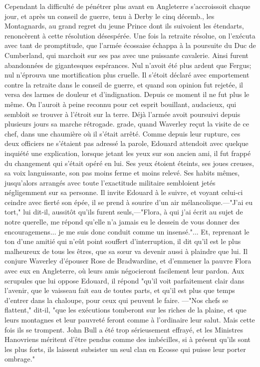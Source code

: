 {Cependant la difficulté de pénétrer plus avant en Angleterre s'accroissoit chaque jour, et après un conseil de guerre, tenu à Derby le cinq décemb., les Montagnards, au grand regret du jeune Prince dont ils suivoient les étendarts, renoncèrent à cette résolution désespérée. Une fois la retraite résolue, on l'exécuta avec tant de promptitude, que l'armée écossaise échappa à la poursuite du Duc de Cumberland, qui marchoit sur ses pas avec une puissante cavalerie.
Ainsi furent abandonnées de gigantesques espérances. Nul n'avoit été plus ardent que Fergus; nul n'éprouva une mortification plus cruelle. Il s'étoit déclaré avec emportement contre la retraite dans le conseil de guerre, et quand son opinion fut rejetée, il versa des larmes de douleur et d'indignation. Depuis ce moment il ne fut plus le même. On l'auroit à peine reconnu pour cet esprit bouillant, audacieux, qui sembloit se trouver à l'étroit sur la terre. Déjà l'armée avoit poursuivi depuis plusieurs jours sa marche rétrogade.\setcounter{page}{365} grade, quand Waverley reçut la visite de ce chef, dans une chaumière où il s’était arrêté.
Comme depuis leur rupture, ces deux officiers ne s’étaient pas adressé la parole, Edouard attendoit avec quelque inquiété une explication, lorsque jetant les yeux sur son ancien ami, il fut frappé du changement qui s’était opéré en lui. Ses yeux étoient éteints, ses joues creuses, sa voix languissante, son pas moins ferme et moins relevé. Ses habits mêmes, jusqu’alors arrangés avec toute l’exactitude militaire sembloient jetés négligemment sur sa personne. Il invite Edouard à le suivre, et voyant celui-ci ceindre avec fierté son épée, il se prend à sourire d’un air mélancolique.—"J’ai eu tort," lui dit-il, aussitôt qu’ils furent seuls,—"Flora, à qui j’ai écrit au sujet de notre querelle, me répond qu’elle n’a jamais eu le dessein de vous donner des encouragemens... je me suis donc conduit comme un insensé."... Et, reprenant le ton d’une amitié qui n’eût point souffert d’interruption, il dit qu’il est le plus malheureux de tous les êtres, que sa sœur va devenir aussi à plaindre que lui. Il conjure Waverley d’épouser Rose de Bradwardine, et d’emmener la pauvre Flora avec eux en Angleterre, où leurs amis négocieront facilement leur pardon. Aux scrupules que lui oppose Edouard, il répond\setcounter{page}{366} "qu'il voit parfaitement clair dans l'avenir, que le vaisseau fait eau de toutes parts, et qu'il est plus que temps d'entrer dans la chaloupe, pour ceux qui peuvent le faire. —"Nos chefs se flattent," dit-il, "que les exécutions tomberont sur les riches de la plaine, et que leurs montagnes et leur pauvreté feront comme à l'ordinaire leur salut. Mais cette fois ils se trompent. John Bull a été trop sérieusement effrayé, et les Ministres Hanovriens méritent d'être pendus comme des imbécilles, si à présent qu'ils sont les plus forts, ils laissent subsister un seul clan en Ecosse qui puisse leur porter ombrage."
}
